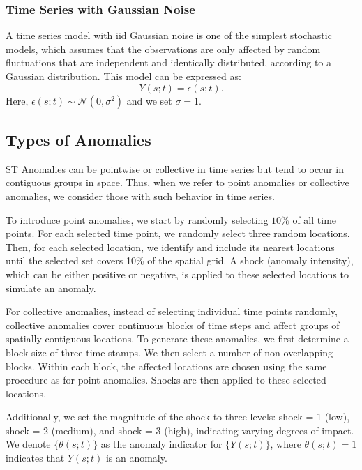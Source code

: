 \documentclass[11pt]{article}
\begin{document}
\subsubsection*{Time Series with Gaussian Noise}
A time series model with iid Gaussian noise is one of the simplest stochastic models, which assumes that the observations are only affected by random fluctuations that are independent and identically distributed, according to a Gaussian distribution. This model can be expressed as:
\begin{equation}
	Y(s;t) = \epsilon(s;t).
\end{equation}
Here, $\epsilon(s;t) \sim \mathcal{N}(0, \sigma^2)$ and we set $\sigma=1$.



\subsection{Types of Anomalies}
ST Anomalies can be pointwise or collective in time series but tend to occur in contiguous groups in space. Thus, when we refer to point anomalies or collective anomalies, we consider those with such behavior in time series. 

To introduce point anomalies, we start by randomly selecting $10\%$ of all time points. For each selected time point, we randomly select three random locations. Then, for each selected location, we identify and include its nearest locations until the selected set covers 10\% of the spatial grid. A shock (anomaly intensity), which can be either positive or negative, is applied to these selected locations to simulate an anomaly.


For collective anomalies, instead of selecting individual time points randomly, collective anomalies cover continuous blocks of time steps and affect groups of spatially contiguous locations. To generate these anomalies, we first determine a block size of three time stamps. We then select a number of non-overlapping blocks. Within each block, the affected locations are chosen using the same procedure as for point anomalies. Shocks are then applied to these selected locations.

Additionally, we set the magnitude of the shock to three levels: shock = 1 (low), shock = 2 (medium), and shock = 3 (high), indicating varying degrees of impact. We denote $\{\theta(s;t)\}$ as the anomaly indicator for $\{Y(s;t)\}$, where $\theta(s;t) = 1$ indicates that $Y(s;t)$ is an anomaly.
\end{document}
